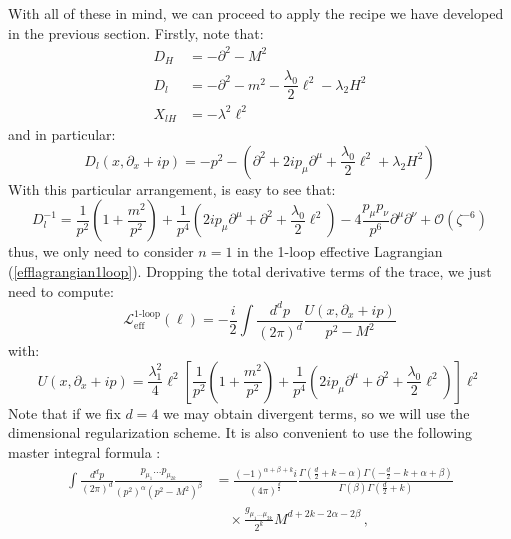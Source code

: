 \documentclass[11pt]{article}
\begin{document}
With all of these in mind, we can proceed to apply the recipe we have developed in the previous section. Firstly, note that:
\begin{align}
    D_H&=-\partial^2-M^2\\
    D_l&=-\partial^2-m^2-\dfrac{\lambda_0}{2}\ell^2-\lambda_2H^2\\
    X_{lH}&=-\lambda^2\ell^2
\end{align}
and in particular:
\begin{equation}
     D_l(x,\partial_x+ip)=-p^2-\left(\partial^2+2ip_\mu\partial^\mu+\dfrac{\lambda_0}{2}\ell^2+\lambda_2H^2\right)
\end{equation}
With this particular arrangement, is easy to see that:
\begin{equation}
    D_l^{-1}=\dfrac{1}{p^2}\left( 1+\dfrac{m^2}{p^2}\right)+\dfrac{1}{p^4}\left(2ip_\mu\partial^\mu+\partial^2+\dfrac{\lambda_0}{2}\ell^2 \right)-4\dfrac{p_\mu p_\nu}{p^6}\partial^\mu\partial^\nu+\mathcal{O}(\zeta^{-6})
\end{equation}
thus, we only need to consider $n=1$ in the 1-loop effective Lagrangian (\ref{efflagrangian1loop}). Dropping the total derivative terms of the trace, we just need to compute:
\begin{equation}
    \mathcal{L}_{\text{eff}}^{\text{1-loop}}(\ell)=-\dfrac{i}{2}\int\dfrac{d^dp}{(2\pi)^d}\dfrac{U(x,\partial_x+ip)}{p^2-M^2}
\end{equation}
with:
\begin{equation}
    U(x,\partial_x+ip)=\dfrac{\lambda_1^2}{4}\ell^2\left[\dfrac{1}{p^2}\left(1+\dfrac{m^2}{p^2}\right)+\dfrac{1}{p^4}\left(2ip_\mu\partial^\mu+\partial^2+\dfrac{\lambda_0}{2}\ell^2 \right)  \right]\ell^2
\end{equation}
Note that if we fix $d=4$ we may obtain divergent terms, so we will use the dimensional regularization scheme. It is also convenient to use the following master integral formula \cite{Fuentes_Mart_n_2016}:
\begin{equation} \tag{20}
\begin{split}
\int \frac{d^d p}{(2\pi)^d} \frac{p_{\mu_1} \dots p_{\mu_{2k}}}{(p^2)^\alpha (p^2 - M^2)^\beta} 
&= \frac{(-1)^{\alpha+\beta+k} i}{(4\pi)^{\frac{d}{2}}} 
\frac{\Gamma \left( \frac{d}{2} + k - \alpha \right) \Gamma \left( -\frac{d}{2} - k + \alpha + \beta \right)}{\Gamma(\beta) \Gamma \left( \frac{d}{2} + k \right)} \\
&\quad \times \frac{g_{\mu_1 \dots \mu_{2k}}}{2^k} M^{d+2k-2\alpha-2\beta} \,,
\end{split}
\end{equation}
\end{document}
